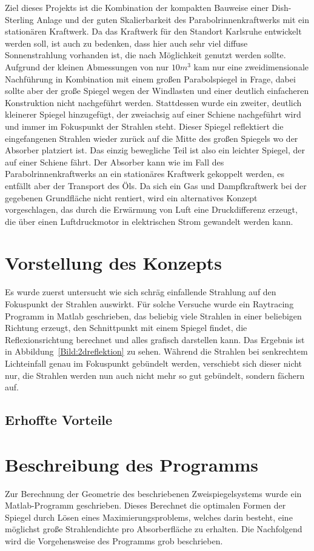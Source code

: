 \documentclass[fontsize=10pt,paper=a4,bibliography=totoc]{scrartcl}
\newcommand{\maxim}[1]{{ \color{blue} #1}}
\begin{document}
Ziel dieses Projekts ist die Kombination der kompakten Bauweise einer Dish-Sterling Anlage und der guten Skalierbarkeit des Parabolrinnenkraftwerks mit ein stationären Kraftwerk. Da das Kraftwerk für den Standort Karlsruhe entwickelt werden soll, ist auch zu bedenken, dass hier auch sehr viel diffuse Sonnenstrahlung vorhanden ist, die nach Möglichkeit genutzt werden sollte. Aufgrund der kleinen Abmessungen von nur $10\unit{m}^3$ kam nur eine zweidimensionale Nachführung in Kombination mit einem großen Parabolspiegel in Frage, dabei sollte aber der große Spiegel wegen der Windlasten und einer deutlich einfacheren Konstruktion nicht nachgeführt werden. Stattdessen wurde ein zweiter, deutlich kleinerer Spiegel hinzugefügt, der zweiachsig auf einer Schiene nachgeführt wird und immer im Fokuspunkt der Strahlen steht. Dieser Spiegel reflektiert die eingefangenen Strahlen wieder zurück auf die Mitte des großen Spiegels wo der Absorber platziert ist. Das einzig bewegliche Teil ist also ein leichter Spiegel, der auf einer Schiene fährt. Der Absorber kann wie im Fall des Parabolrinnenkraftwerks an ein stationäres Kraftwerk gekoppelt werden, es entfällt aber der Transport des Öls. Da sich ein Gas und Dampfkraftwerk bei der gegebenen Grundfläche nicht rentiert, wird ein alternatives Konzept vorgeschlagen, das durch die Erwärmung von Luft eine Druckdifferenz erzeugt, die über einen Luftdruckmotor in elektrischen Strom gewandelt werden kann. 

\section{Vorstellung des Konzepts}
Es wurde zuerst untersucht wie sich schräg einfallende Strahlung auf den Fokuspunkt der Strahlen auswirkt. Für solche Versuche wurde ein Raytracing Programm in Matlab geschrieben, das beliebig viele Strahlen in einer beliebigen Richtung erzeugt, den Schnittpunkt mit einem Spiegel findet, die Reflexionsrichtung berechnet und alles grafisch darstellen kann. Das Ergebnis ist in Abbildung~\ref{Bild:2dreflektion} zu sehen. Während die Strahlen bei senkrechtem Lichteinfall genau im Fokuspunkt gebündelt werden, verschiebt sich dieser nicht nur, die Strahlen werden nun auch nicht mehr so gut gebündelt, sondern fächern auf. 
\subsection{Erhoffte Vorteile}

\section{Beschreibung des Programms}
\maxim{
Zur Berechnung der Geometrie des beschriebenen Zweispiegelsystems wurde ein Matlab-Programm geschrieben. Dieses Berechnet die optimalen Formen der Spiegel durch Lösen eines Maximierungsproblems, welches darin besteht, eine möglichst große Strahlendichte pro Absorberfläche zu erhalten. Die 
Nachfolgend wird die Vorgehensweise des Programms grob beschrieben.
}
\end{document}

